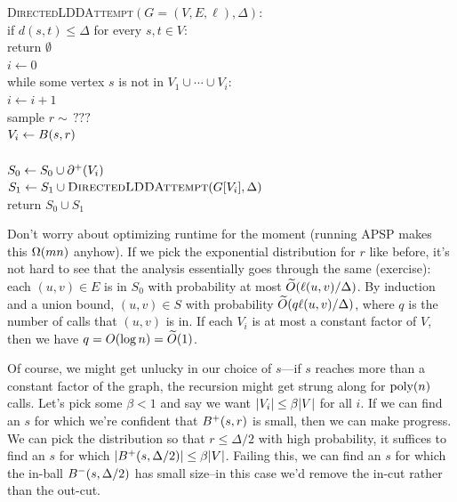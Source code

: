 \documentclass[12pt]{article}
\begin{document}
\begin{centeralgo}
  \textsc{DirectedLDDAttempt}$(G = (V, E, \ell), \Delta)$:\+
  \\  if $d(s, t) \leq \Delta$ for every $s, t \in V$: \+
  \\    return $\emptyset$\-
  \\  $i \gets 0$
  \\  while some vertex $s$ is not in $V_1 \cup \cdots \cup V_i$:\+
  \\    $i \gets i + 1$
  \\    sample $r \sim \,???$ 
  \\    $V_i \gets \ball{s, r}$ 
  \\     
  \\    $S_0 \gets S_0 \cup \outcut{V_i}$
  \\    $S_1 \gets S_1 \cup \textsc{DirectedLDDAttempt}(G[V_i], \Delta)$\-
  \\  return $S_0 \cup S_1$
\end{centeralgo}

Don't worry about optimizing runtime for the moment (running APSP makes this
$\bigOmega{mn}$ anyhow). If we pick the exponential distribution for $r$ like
before, it's not hard to see that the analysis essentially goes through the same
(exercise): each $(u, v) \in E$ is in $S_0$ with probability at most
$\apxO{\ell(u, v)/\Delta}$. By induction and a union bound, $(u, v) \in S$ with
probability $\apxO{q\ell(u, v)/\Delta}$, where $q$ is the number of calls that
$(u, v)$ is in. If each $V_i$ is at most a constant factor of $V$, then we have
$q = O(\log n) = \apxO{1}$.

Of course, we might get unlucky in our choice of $s$---if $s$ reaches more than
a constant factor of the graph, the recursion might get strung along for
$\text{poly}(n)$ calls. Let's pick some $\beta < 1$ and say we want
$\sizeof{V_i} \leq \beta|V|$ for all $i$. If we can find an $s$ for which we're
confident that $\outball{s, r}$ is small, then we can make progress. We can pick
the distribution so that $r \leq \Delta/2$ with high probability, it suffices to
find an $s$ for which $\sizeof{\outball{s, \Delta/2}} \leq \beta \sizeof{V}$.
Failing this, we can find an $s$ for which the in-ball $\inball{s, \Delta/2}$
has small size--in this case we'd remove the in-cut rather than the out-cut.
\end{document}
